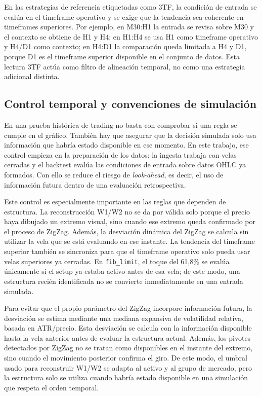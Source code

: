En las estrategias de referencia etiquetadas como 3TF, la condici\'on de entrada
se eval\'ua en el timeframe operativo y se exige que la tendencia sea coherente en
timeframes superiores. Por ejemplo, en M30:H1 la entrada se revisa sobre M30 y el
contexto se obtiene de H1 y H4; en H1:H4 se usa H1 como timeframe operativo y H4/D1
como contexto; en H4:D1 la comparaci\'on queda limitada a H4 y D1, porque D1 es
el timeframe superior disponible en el conjunto de datos. Esta lectura 3TF act\'ua
como filtro de alineaci\'on temporal, no como una estrategia adicional distinta.

\subsection{Control temporal y convenciones de simulaci\'on}
\label{subsec:control-temporal-backtesting}

En una prueba hist\'orica de trading no basta con comprobar si una regla se
cumple en el gr\'afico. Tambi\'en hay que asegurar que la decisi\'on simulada solo
usa informaci\'on que habr\'ia estado disponible en ese momento. En este trabajo,
ese control empieza en la preparaci\'on de los datos: la ingesta trabaja con
velas cerradas y el backtest eval\'ua las condiciones de entrada sobre datos
OHLC ya formados. Con ello se reduce el riesgo de \textit{look-ahead}, es
decir, el uso de informaci\'on futura dentro de una evaluaci\'on retrospectiva.

Este control es especialmente importante en las reglas que dependen de
estructura. La reconstrucci\'on W1/W2 no se da por v\'alida solo porque el precio
haya dibujado un extremo visual, sino cuando ese extremo queda confirmado por
el proceso de ZigZag. Adem\'as, la desviaci\'on din\'amica del ZigZag se calcula
sin utilizar la vela que se est\'a evaluando en ese instante. La tendencia del
timeframe superior tambi\'en se sincroniza para que el timeframe operativo solo
pueda usar velas superiores ya cerradas. En \texttt{fib\_limit}, el toque del 61,8\% se
eval\'ua \'unicamente si el setup ya estaba activo antes de esa vela; de este
modo, una estructura reci\'en identificada no se convierte inmediatamente en una
entrada simulada.

Para evitar que el propio par\'ametro del ZigZag incorpore informaci\'on futura,
la desviaci\'on se estima mediante una mediana expansiva de volatilidad relativa,
basada en ATR/precio. Esta desviaci\'on se calcula con la informaci\'on disponible
hasta la vela anterior antes de evaluar la estructura actual.
Adem\'as, los pivotes detectados por ZigZag no se tratan como disponibles en el
instante del extremo, sino cuando el movimiento posterior confirma el giro. De
este modo, el umbral usado para reconstruir W1/W2 se adapta al activo y al grupo
de mercado, pero la estructura solo se utiliza cuando habr\'ia estado disponible
en una simulaci\'on que respeta el orden temporal.

